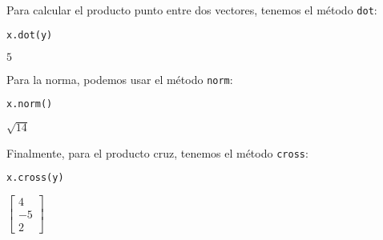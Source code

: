 \documentclass[a4,11pt]{aleph-notas}
\begin{document}
Para calcular el producto punto entre dos vectores, tenemos el método \texttt{dot}:
\begin{pycodigo}
    \begin{ipynbcodigo}\begin{lstlisting}[language=Python]
x.dot(y)
    \end{lstlisting}\end{ipynbcodigo}
    \begin{ipynbsalida}[2mm]
$\displaystyle 5$
    \end{ipynbsalida}
\end{pycodigo}

Para la norma, podemos usar el método \texttt{norm}:
\begin{pycodigo}
    \begin{ipynbcodigo}\begin{lstlisting}[language=Python]
x.norm()
    \end{lstlisting}\end{ipynbcodigo}
    \begin{ipynbsalida}
$\displaystyle \sqrt{14}$
    \end{ipynbsalida}
\end{pycodigo}

Finalmente, para el producto cruz, tenemos el método \texttt{cross}:
\begin{pycodigo}
    \begin{ipynbcodigo}\begin{lstlisting}[language=Python]
x.cross(y)
    \end{lstlisting}\end{ipynbcodigo}
    \begin{ipynbsalida}
$\displaystyle \left[\begin{matrix}4\\-5\\2\end{matrix}\right]$
    \end{ipynbsalida}
\end{pycodigo}
\end{document}
